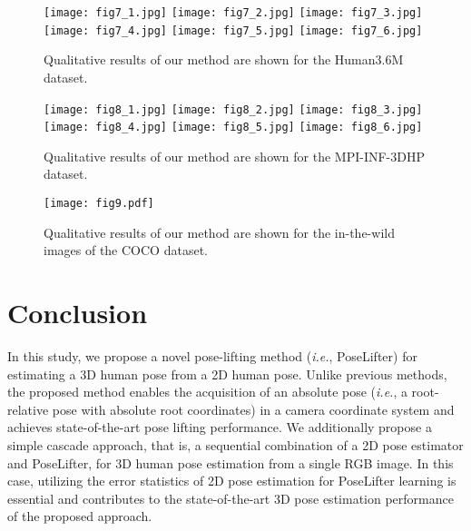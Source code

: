 \documentclass[10pt,twocolumn,letterpaper]{article}
\begin{document}
\begin{figure*}[t]
\centering
\texttt{[image: fig7\_1.jpg]}
\texttt{[image: fig7\_2.jpg]}
\texttt{[image: fig7\_3.jpg]}
\texttt{[image: fig7\_4.jpg]}
\texttt{[image: fig7\_5.jpg]}
\texttt{[image: fig7\_6.jpg]}
\caption{Qualitative results of our method are shown for the Human3.6M dataset.}
\label{fig7}
\end{figure*}

\begin{figure*}[t]
\centering
\texttt{[image: fig8\_1.jpg]}
\texttt{[image: fig8\_2.jpg]}
\texttt{[image: fig8\_3.jpg]}
\texttt{[image: fig8\_4.jpg]}
\texttt{[image: fig8\_5.jpg]}
\texttt{[image: fig8\_6.jpg]}
\caption{Qualitative results of our method are shown for the MPI-INF-3DHP dataset.}
\label{fig8}
\end{figure*}

\begin{figure*}[t]
\centering
\texttt{[image: fig9.pdf]}
\caption{Qualitative results of our method are shown for the in-the-wild images of the COCO dataset.}
\label{fig9}
\end{figure*}


\section{Conclusion}
\label{sec6}

In this study, we propose a novel pose-lifting method (\textit{i.e.}, PoseLifter) for estimating a 3D human pose from a 2D human pose. Unlike previous methods, the proposed method enables the acquisition of an absolute pose (\textit{i.e.}, a root-relative pose with absolute root coordinates) in a camera coordinate system and achieves state-of-the-art pose lifting performance. We additionally propose a simple cascade approach, that is, a sequential combination of a 2D pose estimator and PoseLifter, for 3D human pose estimation from a single RGB image. In this case, utilizing the error statistics of 2D pose estimation for PoseLifter learning is essential and contributes to the state-of-the-art 3D pose estimation performance of the proposed approach.



{\small


}
\end{document}
